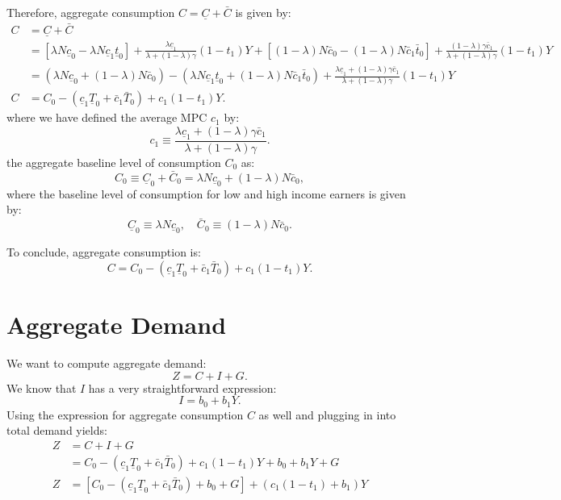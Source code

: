 \documentclass[]{book}
\theoremstyle{definition}
\theoremstyle{definition}
\theoremstyle{definition}
\theoremstyle{remark}
\begin{document}
Therefore, aggregate consumption \(C=\underline{C} + \bar{C}\) is given
by: \[
\begin{aligned}
C&=\underline{C} + \bar{C}\\
&=\left[\lambda N  \underline{c}_{0}-\lambda  N \underline{c}_{1} \underline{t}_0 \right]+ \frac{\lambda \underline{c}_{1}}{\lambda+(1-\lambda)\gamma}(1-t_1)Y + 
\left[(1-\lambda)  N \bar{c}_{0}-(1-\lambda) N  \bar{c}_{1} \bar{t}_0\right] + 
\frac{(1-\lambda) \gamma\bar{c}_{1}}{\lambda+(1-\lambda)\gamma}(1-t_1)Y\\
&=\left(\lambda N  \underline{c}_{0}+(1-\lambda) N  \bar{c}_{0}\right)-\left(\lambda  N \underline{c}_{1} \underline{t}_0 +(1-\lambda) N  \bar{c}_{1} \bar{t}_0\right) +\frac{\lambda\underline{c}_{1}+\left(1-\lambda\right)\gamma\bar{c}_{1}}{\lambda+(1-\lambda)\gamma}(1-t_1)Y\\
C&=C_0 -\left(\underline{c}_{1}\underline{T}_0+\bar{c}_{1}\bar{T}_0\right)+c_1 (1-t_1) Y.
\end{aligned}
\] where we have defined the average MPC \(c_1\) by:
\[c_{1}\equiv\frac{\lambda\underline{c}_{1}+\left(1-\lambda\right)\gamma\bar{c}_{1}}{\lambda+(1-\lambda)\gamma}.\]
the aggregate baseline level of consumption \(C_0\) as:
\[C_{0} \equiv \underline{C}_0 +  \bar{C}_0 = \lambda  N \underline{c}_0 + (1-\lambda) N \bar{c}_0,\]
where the baseline level of consumption for low and high income earners
is given by:
\[\underline{C}_0\equiv \lambda  N \underline{c}_0, \quad \bar{C}_0\equiv (1-\lambda) N \bar{c}_0.\]

To conclude, aggregate consumption is:
\[\boxed{C = C_0 -\left(\underline{c}_{1}\underline{T}_0+\bar{c}_{1}\bar{T}_0\right)+c_1 (1-t_1) Y}.\]

\section{Aggregate Demand}\label{aggregate-demand}

We want to compute aggregate demand: \[Z=C+I+G.\] We know that \(I\) has
a very straightforward expression: \[I=b_0 +b_1 Y.\] Using the
expression for aggregate consumption \(C\) as well and plugging in into
total demand yields: \[
\begin{aligned}
Z   &=C+I+G\\
    &=C_0 -\left(\underline{c}_{1}\underline{T}_0+\bar{c}_{1}\bar{T}_0\right)+c_1 (1-t_1) Y + b_{0}+b_{1}Y+G\\
Z   &=\left[C_0 -\left(\underline{c}_{1}\underline{T}_0+\bar{c}_{1}\bar{T}_0\right)+ b_{0} + G \right]+ \left(c_1(1-t_1) + b_1\right) Y 
\end{aligned}
\]
\end{document}
